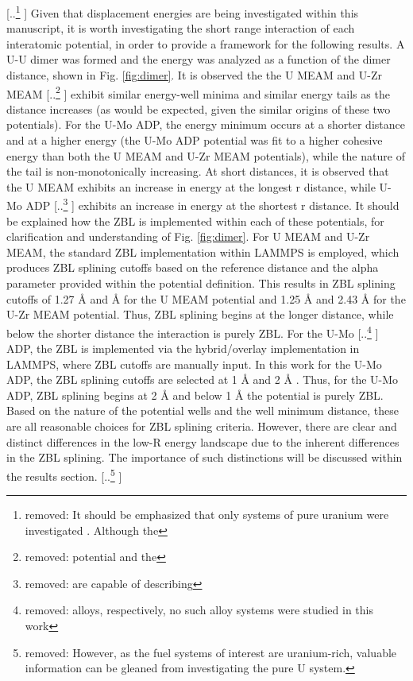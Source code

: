 \documentclass[review]{elsarticle}
\providecommand{\DIFaddtex}[1]{{\protect\color{blue} \sf #1}} %
\providecommand{\DIFdeltex}[1]{{\protect\color{red} [..\footnote{removed: #1} ]}} %
\providecommand{\DIFaddbegin}{} %
\providecommand{\DIFaddend}{} %
\providecommand{\DIFdelbegin}{} %
\providecommand{\DIFdelend}{} %
\providecommand{\DIFadd}[1]{\texorpdfstring{\DIFaddtex{#1}}{#1}} %
\providecommand{\DIFdel}[1]{\texorpdfstring{\DIFdeltex{#1}}{}} %
\newcommand{\DIFscaledelfig}{0.5}
\newlength{\DIFdelgraphicswidth} %
\newlength{\DIFdelgraphicsheight} %
\newcommand{\DIFaddincludegraphics}[2][]{{\color{blue}\fbox{\DIFOincludegraphics[#1]{#2}}}} %
\newcommand{\DIFdelincludegraphics}[2][]{%
\sbox{\DIFdelgraphicsbox}{\DIFOincludegraphics[#1]{#2}}%
\settoboxwidth{\DIFdelgraphicswidth}{\DIFdelgraphicsbox} %
\settoboxtotalheight{\DIFdelgraphicsheight}{\DIFdelgraphicsbox} %
\scalebox{\DIFscaledelfig}{%
\parbox[b]{\DIFdelgraphicswidth}{\usebox{\DIFdelgraphicsbox}\\[-\baselineskip] \rule{\DIFdelgraphicswidth}{0em}}\llap{\resizebox{\DIFdelgraphicswidth}{\DIFdelgraphicsheight}{%
\setlength{\unitlength}{\DIFdelgraphicswidth}%
\begin{picture}(1,1)%
\thicklines\linethickness{2pt} %
{\color[rgb]{1,0,0}\put(0,0){\framebox(1,1){}}}%
{\color[rgb]{1,0,0}\put(0,0){\line( 1,1){1}}}%
{\color[rgb]{1,0,0}\put(0,1){\line(1,-1){1}}}%
\end{picture}%
}\hspace*{3pt}}} %
} %
\DeclareRobustCommand{\DIFaddbegin}{\DIFOaddbegin \let\includegraphics\DIFaddincludegraphics} %
\DeclareRobustCommand{\DIFaddend}{\DIFOaddend \let\includegraphics\DIFOincludegraphics} %
\DeclareRobustCommand{\DIFdelbegin}{\DIFOdelbegin \let\includegraphics\DIFdelincludegraphics} %
\DeclareRobustCommand{\DIFdelend}{\DIFOaddend \let\includegraphics\DIFOincludegraphics} %
\begin{document}
\DIFdelbegin \DIFdel{It should be emphasized that only systems of pure uranium were investigated . Although the }\DIFdelend \DIFaddbegin \DIFadd{Given that displacement energies are being investigated within this manuscript, it is worth investigating the short range interaction of each interatomic potential, in order to provide a framework for the following results. A U-U dimer was formed and the energy was analyzed as a function of the dimer distance, shown in Fig. \ref{fig:dimer}. It is observed the the U MEAM and }\DIFaddend U-Zr MEAM \DIFdelbegin \DIFdel{potential and the }\DIFdelend \DIFaddbegin \DIFadd{exhibit similar energy-well minima and similar energy tails as the distance increases (as would be expected, given the similar origins of these two potentials). For the }\DIFaddend U-Mo \DIFaddbegin \DIFadd{ADP, the energy minimum occurs at a shorter distance and at a higher energy (the U-Mo ADP potential was fit to a higher cohesive energy than both the U MEAM and U-Zr MEAM potentials), while the nature of the tail is non-monotonically increasing. At short distances, it is observed that the U MEAM exhibits an increase in energy at the longest r distance, while U-Mo }\DIFaddend ADP \DIFdelbegin \DIFdel{are capable of describing }\DIFdelend \DIFaddbegin \DIFadd{exhibits an increase in energy at the shortest r distance. It should be explained how the ZBL is implemented within each of these potentials, for clarification and understanding of Fig. \ref{fig:dimer}. For U MEAM and }\DIFaddend U-Zr \DIFaddbegin \DIFadd{MEAM, the standard ZBL implementation within LAMMPS is employed, which produces ZBL splining cutoffs based on the reference distance and the alpha parameter provided within the potential definition. This results in ZBL splining cutoffs of 1.27 }{\DIFadd{\AA}} \DIFaddend and \DIFaddbegin \DIFadd{2.48 }{\DIFadd{\AA}} \DIFadd{for the U MEAM potential and 1.25 }{\DIFadd{\AA}} \DIFadd{and 2.43 }{\DIFadd{\AA}} \DIFadd{for the U-Zr MEAM potential. Thus, ZBL splining begins at the longer distance, while below the shorter distance the interaction is purely ZBL. For the }\DIFaddend U-Mo \DIFdelbegin \DIFdel{alloys, respectively, no such alloy systems were studied in this work}\DIFdelend \DIFaddbegin \DIFadd{ADP, the ZBL is implemented via the hybrid/overlay implementation in LAMMPS, where ZBL cutoffs are manually input. In this work for the U-Mo ADP, the ZBL splining cutoffs are selected at 1 }{\DIFadd{\AA}} \DIFadd{and 2 }{\DIFadd{\AA}}\DIFadd{. Thus, for the U-Mo ADP, ZBL splining begins at 2 }{\DIFadd{\AA}} \DIFadd{and below 1 }{\DIFadd{\AA}} \DIFadd{the potential is purely ZBL. Based on the nature of the potential wells and the well minimum distance, these are all reasonable choices for ZBL splining criteria. However, there are clear and distinct differences in the low-R energy landscape due to the inherent differences in the ZBL splining. The importance of such distinctions will be discussed within the results section}\DIFaddend . 
\DIFdelbegin \DIFdel{However, as the fuel systems of interest are uranium-rich, valuable information can be gleaned from investigating the pure U system.
}\DIFdelend 
\end{document}
